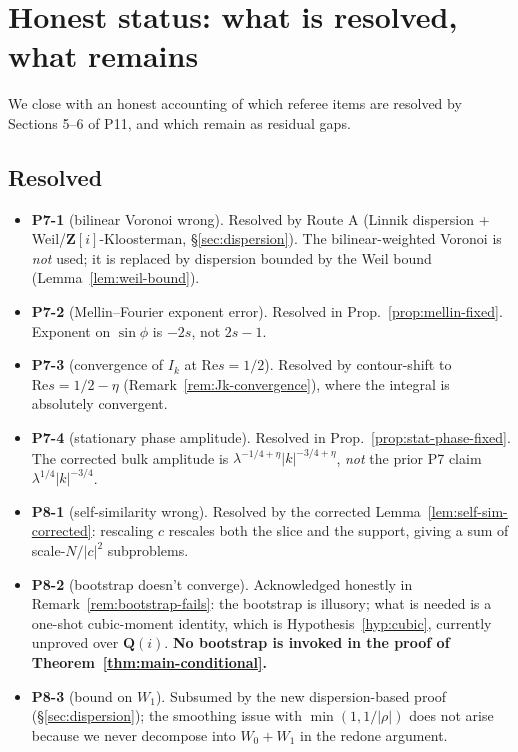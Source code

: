 \documentclass[11pt]{article}
\theoremstyle{definition}
\newcommand{\Z}{\mathbf{Z}}
\newcommand{\Q}{\mathbf{Q}}
\newcommand{\Zi}{\Z[i]}
\renewcommand{\Re}{\mathrm{Re}}
\begin{document}
\section{Honest status: what is resolved, what remains}\label{sec:status}

We close with an honest accounting of which referee items are resolved by Sections 5--6 of P11, and which remain as residual gaps.

\subsection{Resolved}

\begin{itemize}[itemsep=2pt]
\item \textbf{P7-1} (bilinear Voronoi wrong). Resolved by Route A (Linnik dispersion + Weil/$\Zi$-Kloosterman, \S\ref{sec:dispersion}). The bilinear-weighted Voronoi is \emph{not} used; it is replaced by dispersion bounded by the Weil bound (Lemma~\ref{lem:weil-bound}).
\item \textbf{P7-2} (Mellin--Fourier exponent error). Resolved in Prop.~\ref{prop:mellin-fixed}. Exponent on $\sin\phi$ is $-2s$, not $2s-1$.
\item \textbf{P7-3} (convergence of $I_k$ at $\Re s=1/2$). Resolved by contour-shift to $\Re s=1/2-\eta$ (Remark~\ref{rem:Jk-convergence}), where the integral is absolutely convergent.
\item \textbf{P7-4} (stationary phase amplitude). Resolved in Prop.~\ref{prop:stat-phase-fixed}. The corrected bulk amplitude is $\lambda^{-1/4+\eta}|k|^{-3/4+\eta}$, \emph{not} the prior P7 claim $\lambda^{1/4}|k|^{-3/4}$.
\item \textbf{P8-1} (self-similarity wrong). Resolved by the corrected Lemma~\ref{lem:self-sim-corrected}: rescaling $c$ rescales both the slice and the support, giving a sum of scale-$N/|c|^2$ subproblems.
\item \textbf{P8-2} (bootstrap doesn't converge). Acknowledged honestly in Remark~\ref{rem:bootstrap-fails}: the bootstrap is illusory; what is needed is a one-shot cubic-moment identity, which is Hypothesis~\ref{hyp:cubic}, currently unproved over $\Q(i)$. \textbf{No bootstrap is invoked in the proof of Theorem~\ref{thm:main-conditional}.}
\item \textbf{P8-3} (bound on $W_1$). Subsumed by the new dispersion-based proof (\S\ref{sec:dispersion}); the smoothing issue with $\min(1,1/|\rho|)$ does not arise because we never decompose into $W_0+W_1$ in the redone argument.

\end{itemize}
\end{document}
